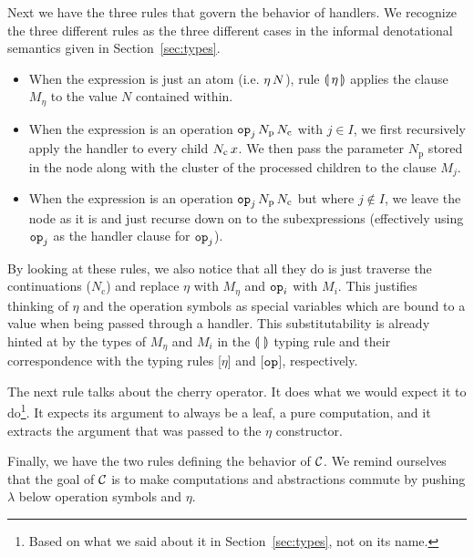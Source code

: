 Next we have the three rules that govern the behavior of handlers. We
recognize the three different rules as the three different cases in the
informal denotational semantics given in Section~\ref{sec:types}.

\begin{itemize}
\item When the expression is just an atom (i.e. $\eta\,N$), rule
  $\llparenthesis \, \eta \, \rrparenthesis$ applies the clause $M_\eta$ to the value $N$ contained
  within.
\item When the expression is an operation
  $\mathtt{op}_j\,N_{\mathrm{p}}\,N_{\mathrm{c}}$ with $j \in I$, we
  first recursively apply the handler to every child
  $N_{\mathrm{c}}\,x$. We then pass the parameter $N_{\mathrm{p}}$
  stored in the node along with the cluster of the processed children to
  the clause $M_j$.
\item When the expression is an operation
  $\mathtt{op}_j\,N_{\mathrm{p}}\,N_{\mathrm{c}}$ but where $j \notin I$,
  we leave the node as it is and just recurse down on to the subexpressions
  (effectively using $\mathtt{op}_j$ as the handler clause for $\mathtt{op}_j$).
\end{itemize}

By looking at these rules, we also notice that all they do is just traverse
the continuations ($N_{\mathrm{c}}$) and replace $\eta$ with $M_\eta$ and
$\mathtt{op}_i$ with $M_i$. This justifies thinking of $\eta$ and the operation
symbols as special variables which are bound to a value when being passed
through a handler. This substitutability is already hinted at by the types
of $M_\eta$ and $M_i$ in the $\llparenthesis \,  \, \rrparenthesis$ typing rule and their
correspondence with the typing rules [$\eta$] and [$\mathtt{op}$],
respectively.

The next rule talks about the cherry operator. It does what we would expect
it to do\footnote{Based on what we said about it in
  Section~\ref{sec:types}, not on its name.}. It expects its argument to
always be a leaf, a pure computation, and it extracts the argument that was
passed to the $\eta$ constructor.

Finally, we have the two rules defining the behavior of $\mathcal{C}$. We remind
ourselves that the goal of $\mathcal{C}$ is to make computations and abstractions
commute by pushing $\lambda$ below operation symbols and $\eta$.

